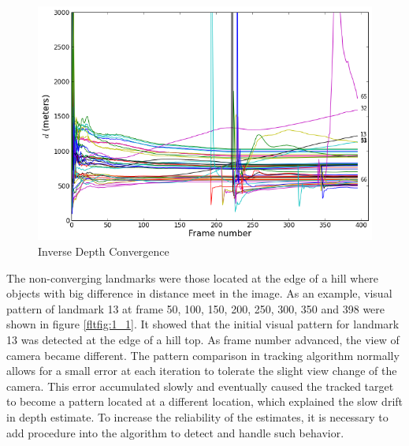 \begin{figure}[h]
\centering
\includegraphics[width=12cm, keepaspectratio=true]{./Figures/fltfig/cut1/Figure10.png}
\caption{Inverse Depth Convergence}
\label{fltfig:1}
\end{figure}

The non-converging landmarks were those located at the edge of a hill
where objects with big difference in distance meet in the image. As an
example, visual pattern of landmark 13 at frame 50, 100, 150, 200,
250, 300, 350 and 398 were shown in figure \ref{fltfig:1_1}. It showed
that the initial visual pattern for landmark 13 was detected at the
edge of a hill top. As frame number advanced, the view of camera
became different. The pattern comparison in tracking algorithm
normally allows for a small error at each iteration to tolerate the
slight view change of the camera. This error accumulated slowly and
eventually caused the tracked target to become a pattern located at a
different location, which explained the slow drift in depth estimate.
To increase the reliability of the estimates, it is necessary to add
procedure into the algorithm to detect and handle such behavior.

